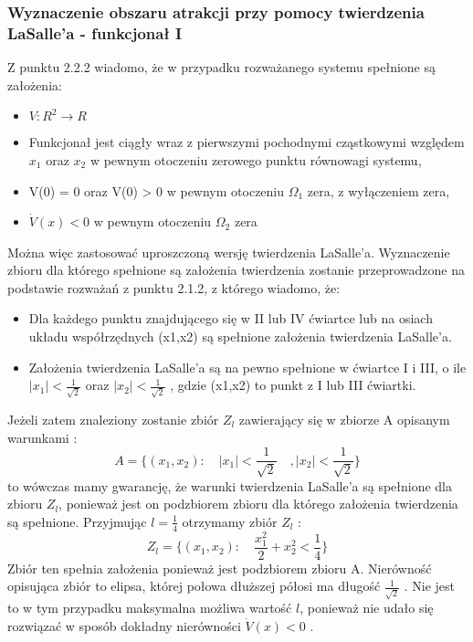 \documentclass[a4paper,11pt]{article}
\begin{document}
\subsubsection{Wyznaczenie obszaru atrakcji przy pomocy twierdzenia LaSalle'a - funkcjonał I}
Z punktu 2.2.2 wiadomo, że w przypadku rozważanego systemu spełnione są założenia: 
\begin{itemize}
\item \( V : R^{2} \rightarrow R \)
\item Funkcjonał jest ciągły wraz z pierwszymi pochodnymi cząstkowymi względem \(x_{1}\) oraz \(x_{2}\) w pewnym otoczeniu zerowego punktu równowagi systemu, 
\item V(0) = 0 oraz V(0) > 0 w pewnym otoczeniu \(\Omega_{1}\) zera, z wyłączeniem zera, 
\item \( \dot{V}(x)< 0 \) w pewnym otoczeniu \( \Omega_{2}\) zera
\end{itemize}
Można więc zastosować uproszczoną wersję twierdzenia LaSalle'a. Wyznaczenie zbioru dla którego spełnione są założenia twierdzenia zostanie przeprowadzone na podstawie rozważań z punktu 2.1.2, z którego wiadomo, że:
\begin{itemize}
\item Dla każdego punktu znajdującego się w II lub IV ćwiartce lub na osiach układu współrzędnych (x1,x2) są spełnione założenia twierdzenia LaSalle'a. 
\item Założenia twierdzenia LaSalle'a są na pewno spełnione w ćwiartce I i III, o ile \( | x_{1} | < \frac{1}{\sqrt{2}} \) oraz \( | x_{2} | < \frac{1}{\sqrt{2}} \) , gdzie (x1,x2) to punkt z I lub III ćwiartki. 
\end{itemize}
Jeżeli zatem znaleziony zostanie zbiór \( Z_{l} \) zawierający się w zbiorze A opisanym warunkami : 
\begin{equation*}
A= \{ (x_{1},x_{2}) : \quad |x_{1}|<\frac{1}{\sqrt{2}} \quad , |x_{2}|<\frac{1}{\sqrt{2}} \}
\end{equation*}
to wówczas mamy gwarancję, że warunki twierdzenia LaSalle'a są spełnione dla zbioru \( Z_{l} \), ponieważ jest on podzbiorem zbioru dla którego założenia twierdzenia są spełnione. 
Przyjmując \( l = \frac{1}{4} \) otrzymamy zbiór \( Z_{l} \) : 
\begin{equation*}
Z_{l} = \{ (x_{1},x_{2}) : \quad \frac{x_{1}^{2}}{2}+x_{2}^{2} < \frac{1}{4} \}
\end{equation*}
Zbiór ten spełnia założenia ponieważ jest podzbiorem zbioru A. Nierówność opisująca zbiór to elipsa, której połowa dłuższej półosi ma długość \( \frac{1}{\sqrt{2}} \) . Nie jest to w tym przypadku maksymalna możliwa wartość \( l \), ponieważ nie udało się rozwiązać w sposób dokładny nierówności \( \dot{V}(x) < 0 \) .
\end{document}
